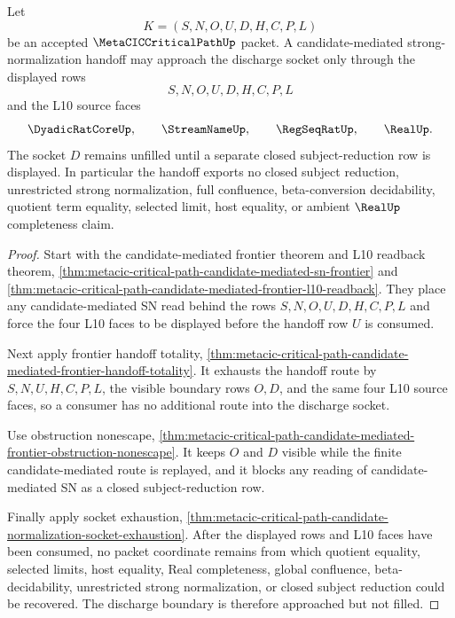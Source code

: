 \begin{theorem}
\label{thm:metacic-critical-path-candidate-mediated-sn-frontier-frontier-discharge}
Let
$$
K=(S,N,O,U,D,H,C,P,L)
$$
be an accepted $\MetaCICCriticalPathUp$ packet. A candidate-mediated strong-normalization handoff may approach the discharge socket only through the displayed rows
$$
S,N,O,U,D,H,C,P,L
$$
and the L10 source faces
$$
\DyadicRatCoreUp,\qquad
\StreamNameUp,\qquad
\RegSeqRatUp,\qquad
\RealUp .
$$
The socket $D$ remains unfilled until a separate closed subject-reduction row is displayed. In particular the handoff exports no closed subject reduction, unrestricted strong normalization, full confluence, beta-conversion decidability, quotient term equality, selected limit, host equality, or ambient $\RealUp$ completeness claim.
\end{theorem}
\begin{proof}
Start with the candidate-mediated frontier theorem and L10 readback theorem, \autoref{thm:metacic-critical-path-candidate-mediated-sn-frontier} and \autoref{thm:metacic-critical-path-candidate-mediated-frontier-l10-readback}. They place any candidate-mediated SN read behind the rows $S,N,O,U,D,H,C,P,L$ and force the four L10 faces to be displayed before the handoff row $U$ is consumed.

Next apply frontier handoff totality, \autoref{thm:metacic-critical-path-candidate-mediated-frontier-handoff-totality}. It exhausts the handoff route by $S,N,U,H,C,P,L$, the visible boundary rows $O,D$, and the same four L10 source faces, so a consumer has no additional route into the discharge socket.

Use obstruction nonescape, \autoref{thm:metacic-critical-path-candidate-mediated-frontier-obstruction-nonescape}. It keeps $O$ and $D$ visible while the finite candidate-mediated route is replayed, and it blocks any reading of candidate-mediated SN as a closed subject-reduction row.

Finally apply socket exhaustion, \autoref{thm:metacic-critical-path-candidate-normalization-socket-exhaustion}. After the displayed rows and L10 faces have been consumed, no packet coordinate remains from which quotient equality, selected limits, host equality, Real completeness, global confluence, beta-decidability, unrestricted strong normalization, or closed subject reduction could be recovered. The discharge boundary is therefore approached but not filled.
\end{proof}

